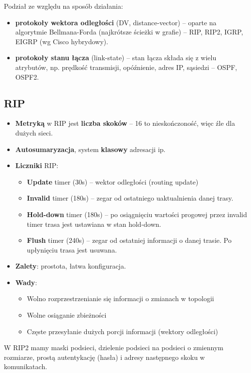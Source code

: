 \documentclass[main.tex]{subfiles}
\begin{document}
    \noindent Podział ze względu na sposób działania:
    \begin{itemize}[noitemsep]
        \item \textbf{protokoły wektora odległości} (DV, distance-vector) -- oparte na algorytmie Bellmana-Forda
        (najkrótsze ścieżki w grafie) -- RIP, RIP2, IGRP, EIGRP (wg Cisco hybrydowy).
        \item \textbf{protokoły stanu łącza} (link-state) -- stan łącza składa się z wielu atrybutów, np. prędkość
        transmisji, opóźnienie, adres IP, sąsiedzi -- OSPF, OSPF2.
    \end{itemize}

    \subsection{RIP}
    \begin{itemize}[noitemsep]
        \item \textbf{Metryką} w RIP jest \textbf{liczba skoków} -- 16 to nieskończoność, więc źle dla dużych sieci.

        \item \textbf{Autosumaryzacja}, system \textbf{klasowy} adresacji ip.

        \item \textbf{Liczniki} RIP:
        \begin{itemize}[noitemsep]
            \item \textbf{Update} timer (30s) – wektor odległości (routing update)
            \item \textbf{Invalid} timer (180s) – zegar od ostatniego uaktualnienia danej trasy.
            \item \textbf{Hold-down} timer (180s) – po osiągnięciu wartości progowej przez invalid timer trasa jest
            ustawiana w stan hold-down.
            \item \textbf{Flush} timer (240s) – zegar od ostatniej informacji o danej trasie. Po upłynięciu trasa jest usuwana.
        \end{itemize}

        \item \textbf{Zalety}: prostota, łatwa konfiguracja.

        \item \textbf{Wady}:
        \begin{itemize}[noitemsep]
            \item Wolno rozprzestrzenianie się informacji o zmianach w topologii
            \item Wolne osiąganie zbieżności
            \item Częste przesyłanie dużych porcji informacji (wektory odległości)
        \end{itemize}
    \end{itemize}
    W RIP2 mamy maski podsieci, dzielenie podsieci na podsieci o zmiennym rozmiarze, prostą autentykację (hasła)
    i adresy następnego skoku w komunikatach.
\end{document}
